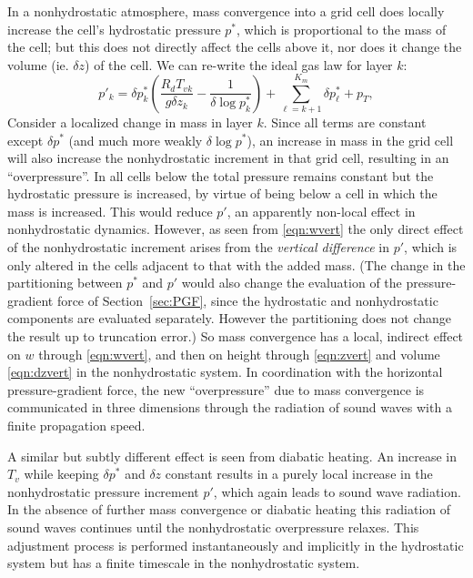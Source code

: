 \documentclass[10pt,letterpaper,margin=1in]{memoir}
\begin{document}
In a nonhydrostatic atmosphere, mass convergence into a grid cell does locally increase the cell's hydrostatic pressure $p^*$, which is proportional to the mass of the cell; but this does not directly affect the cells above it, nor does it change the volume (ie. $\delta z$) of the cell. We can re-write the ideal gas law for layer $k$:
\begin{equation}
p'_k = \delta p^*_k \left ( \frac{R_d T_{vk}}{g \delta z_k} - \frac{1}{\delta \log p^*_k} \right ) + \sum^{K_m}_{\ell=k+1}\delta p^*_\ell + p_T,
\end{equation}
Consider a localized change in mass in layer $k$. Since all terms are constant except $\delta p^*$ (and much more weakly $\delta \log p^*$), an increase in mass in the grid cell will also increase the nonhydrostatic increment in that grid cell, resulting in an ``overpressure''. In all cells below the total pressure remains constant but the hydrostatic pressure is increased, by virtue of being below a cell in which the mass is increased. This would reduce $p'$, an apparently non-local effect in nonhydrostatic dynamics. However, as seen from \eqref{eqn:wvert} the only direct effect of the nonhydrostatic increment arises from the \textit{vertical difference} in $p'$, which is only altered in the cells adjacent to that with the added mass. (The change in the partitioning between $p^*$ and $p'$ would also change the evaluation of the pressure-gradient force of Section~\ref{sec:PGF}, since the hydrostatic and nonhydrostatic components are evaluated separately. However the partitioning does not change the result up to truncation error.) So mass convergence has a local, indirect effect on $w$ through \eqref{eqn:wvert}, and then on height through \eqref{eqn:zvert} and volume \eqref{eqn:dzvert} in the nonhydrostatic system. In coordination with the horizontal pressure-gradient force, the new ``overpressure'' due to mass convergence is communicated in three dimensions through the radiation of sound waves with a finite propagation speed. %

A similar but subtly different effect is seen from diabatic heating. An increase in $T_v$ while keeping $\delta p^*$ and $\delta z$ constant results in a purely local increase in the nonhydrostatic pressure increment $p'$, which again leads to sound wave radiation. In the absence of further mass convergence or diabatic heating this radiation of sound waves continues until the nonhydrostatic overpressure relaxes. This adjustment process is performed instantaneously and implicitly in the hydrostatic system but has a finite timescale in the nonhydrostatic system.
\end{document}

